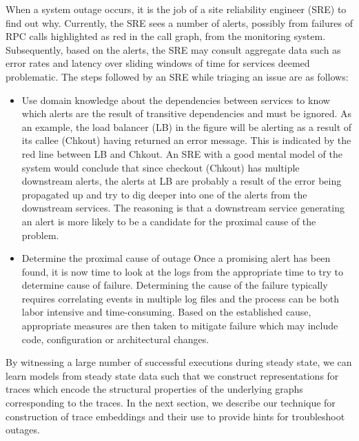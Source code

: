 When a system outage occurs, it is the job of a site reliability engineer (SRE) to find out why. Currently, the SRE sees a number of alerts, possibly from failures of RPC calls highlighted as red in the call graph, from the monitoring system.  Subsequently, based on the alerts, the SRE may consult aggregate data such as error rates and latency over sliding windows of time for services deemed problematic. The steps followed by an SRE while triaging an issue are as follows:
\begin{itemize}
\item Use domain knowledge about the dependencies between services to know which alerts are the result of transitive dependencies and must be ignored. \newline
As an example, the load balancer (LB) in the figure will be alerting as a result of its callee (Chkout) having returned an error message. This is indicated by the red line between LB and Chkout.  
An SRE with a good mental model of the system would conclude that since checkout (Chkout) has multiple downstream alerts, the alerts at LB are probably a result of the error being propagated up and try to dig deeper into one of the alerts from the downstream services. The reasoning is that a downstream service generating an alert is more likely to be a candidate for the proximal cause of the problem.  
\item Determine the proximal cause of outage\newline
Once a promising alert has been found, it is now time to look at the logs from the appropriate time to try to determine cause of failure. Determining the cause of the failure typically requires correlating events in multiple log files and the process can be both labor intensive and time-consuming. Based on the established cause, appropriate measures are then taken to mitigate failure which may include code, configuration or architectural changes.
\end{itemize}

By witnessing a large number of successful executions during steady state, we can learn models from steady state data such that we construct representations for traces which encode the structural properties of the underlying graphs corresponding to the traces. In the next section, we describe our technique for construction of trace embeddings and their use to provide hints for troubleshoot outages. 
